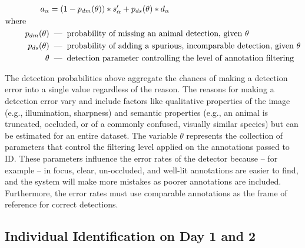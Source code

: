 \begin{align} \label{eq:detection}
    \begin{split}
        a_{\alpha} &= (1 - p_{dm}(\theta))*s^{\prime}_{\alpha} + p_{ds}(\theta)*d_{\alpha} \\
        \text{where} \hspace{1cm} & \\
        p_{dm}(\theta) &\textnormal{\hspace{0.2cm}---\hspace{0.2cm}} \text{probability of missing an animal detection, given $\theta$} \\
        p_{ds}(\theta) &\textnormal{\hspace{0.2cm}---\hspace{0.2cm}} \text{probability of adding a spurious, incomparable detection, given $\theta$} \\
        \theta &\textnormal{\hspace{0.2cm}---\hspace{0.2cm}} \text{detection parameter controlling the level of annotation filtering}
    \end{split}
\end{align}

\noindent The detection probabilities above aggregate the chances of making a detection error into a single value regardless of the reason.  The reasons for making a detection error vary and include factors like qualitative properties of the image (e.g., illumination, sharpness) and semantic properties (e.g., an animal is truncated, occluded, or of a commonly confused, visually similar species) but can be estimated for an entire dataset.  The variable $\theta$ represents the collection of parameters that control the filtering level applied on the annotations passed to ID.  These parameters influence the error rates of the detector because -- for example -- in focus, clear, un-occluded, and well-lit annotations are easier to find, and the system will make more mistakes as poorer annotations are included.  Furthermore, the error rates must use comparable annotations as the frame of reference for correct detections.

\subsection{Individual Identification on Day 1 and 2}

